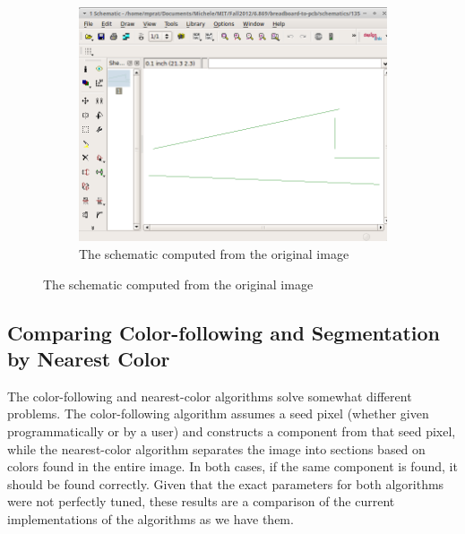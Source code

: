 \documentclass[10pt,twocolumn,letterpaper]{article}
\begin{document}
\begin{figure}[ht]
\begin{subfigure}[b]{\linewidth}
   \includegraphics[width=0.9\linewidth]{demos/full_pipeline2_schematic.png}
	\caption{The schematic computed from the original image}
	\label{fig:schemfull}
\end{subfigure}
\end{figure}

\subsection{Comparing Color-following and Segmentation by Nearest Color}

The color-following and nearest-color algorithms solve somewhat different
problems. The color-following algorithm assumes a seed pixel (whether given
programmatically or by a user) and constructs a component from that seed pixel,
while the nearest-color algorithm separates the image into sections based on
colors found in the entire image. In both cases, if the same component is
found, it should be found correctly. Given that the exact parameters for both
algorithms were not perfectly tuned, these results are a comparison of the
current implementations of the algorithms as we have them.
\end{document}
